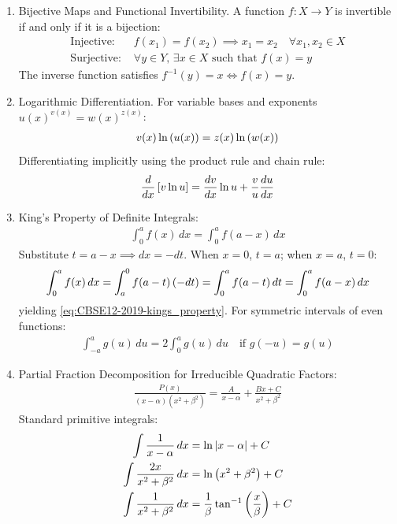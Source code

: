 \begin{enumerate}[label=\thesubsection.\arabic*, ref=\thesubsection.\theenumi]
		\item Bijective Maps and Functional Invertibility.
		A function $f: X \to Y$ is invertible if and only if it is a bijection:
		\begin{align}
			\text{Injective: } & f(x_1) = f(x_2) \implies x_1 = x_2 \quad \forall x_1, x_2 \in X \label{eq:CBSE12-2019-injective} \\
			\text{Surjective: } & \forall y \in Y, \, \exists x \in X \text{ such that } f(x) = y \label{eq:CBSE12-2019-surjective}
		\end{align}
		The inverse function satisfies $f^{-1}(y) = x \iff f(x) = y$.
		
		\item Logarithmic Differentiation.
		For variable bases and exponents $u(x)^{v(x)} = w(x)^{z(x)}$:
		\begin{align}
			v(x)\ln\left(u(x)\right) = z(x)\ln\left(w(x)\right) \label{eq:CBSE12-2019-log_diff}
		\end{align}
		Differentiating implicitly using the product rule and chain rule:
		\begin{align}
			\frac{d}{dx}{}\left[v \ln u\right] = \frac{dv}{dx}\ln u + \frac{v}{u}\frac{du}{dx} \label{eq:CBSE12-2019-product_log_diff}
		\end{align}
		
		\item King's Property of Definite Integrals:
		\begin{align}
			\int_{0}^{a} f(x) \, dx = \int_{0}^{a} f(a - x) \, dx \label{eq:CBSE12-2019-kings_property}
		\end{align}
		\solution
		Substitute $t = a - x \implies dx = -dt$. When $x = 0$, $t = a$; when $x = a$, $t = 0$:
		\begin{align}
			\int_{0}^{a} f(x) \, dx = \int_{a}^{0} f(a - t) \left(-dt\right) = \int_{0}^{a} f(a - t) \, dt = \int_{0}^{a} f(a - x) \, dx
		\end{align}
		yielding \eqref{eq:CBSE12-2019-kings_property}.
		For symmetric intervals of even functions:
		\begin{align}
			\int_{-a}^{a} g(u) \, du = 2\int_{0}^{a} g(u) \, du \quad \text{if } g(-u) = g(u) \label{eq:CBSE12-2019-even_int}
		\end{align}
		
		\item Partial Fraction Decomposition for Irreducible Quadratic Factors:
		\begin{align}
			\frac{P(x)}{(x - \alpha)(x^2 + \beta^2)} = \frac{A}{x - \alpha} + \frac{Bx + C}{x^2 + \beta^2} \label{eq:CBSE12-2019-partial_fractions}
		\end{align}
		Standard primitive integrals:
		\begin{align}
			\int \frac{1}{x - \alpha} \, dx &= \ln\left\vert x - \alpha\right\vert + C \label{eq:CBSE12-2019-int_linear_denom} \\
			\int \frac{2x}{x^2 + \beta^2} \, dx &= \ln\left(x^2 + \beta^2\right) + C \label{eq:CBSE12-2019-int_quad_num} \\
			\int \frac{1}{x^2 + \beta^2} \, dx &= \frac{1}{\beta}\tan^{-1}\left(\frac{x}{\beta}\right) + C \label{eq:CBSE12-2019-int_arctan}
		\end{align}
		

\end{enumerate}
